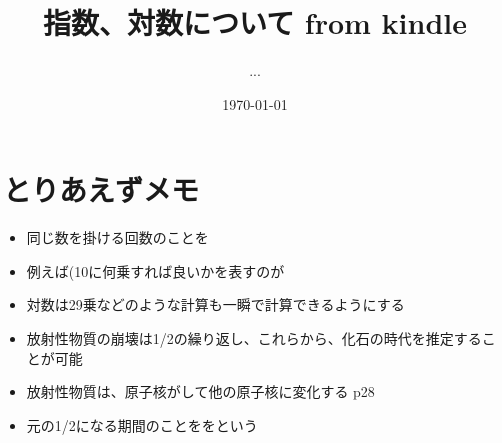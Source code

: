 \documentclass[11pt,a4paper]{jsarticle}
\title{指数、対数について from kindle}
\author{...}
\date{\today}
\begin{document}
\maketitle
%
%
\section{とりあえずメモ}
\begin{itemize}
    \item 同じ数を掛ける回数のことを 
    \item 例えば(10に何乗すれば良いかを表すのが 
    \item 対数は29乗などのような計算も一瞬で計算できるようにする
    \item 放射性物質の崩壊は1/2の繰り返し、これらから、化石の時代を推定することが可能
    \item 放射性物質は、原子核がして他の原子核に変化する p28
    \item 元の1/2になる期間のことををという
\end{itemize}

%
%
\end{document}
